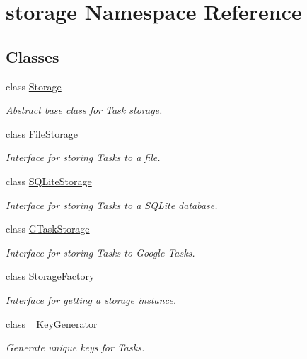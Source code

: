 \hypertarget{namespacestorage}{
\section{storage \-Namespace \-Reference}
\label{namespacestorage}
}
\subsection*{\-Classes}
\begin{DoxyCompactItemize}
\item 
class \hyperlink{classstorage_1_1Storage}{\-Storage}
\begin{DoxyCompactList}\small\item\em \-Abstract base class for \-Task storage. \end{DoxyCompactList}\item 
class \hyperlink{classstorage_1_1FileStorage}{\-File\-Storage}
\begin{DoxyCompactList}\small\item\em \-Interface for storing \-Tasks to a file. \end{DoxyCompactList}\item 
class \hyperlink{classstorage_1_1SQLiteStorage}{\-S\-Q\-Lite\-Storage}
\begin{DoxyCompactList}\small\item\em \-Interface for storing \-Tasks to a \-S\-Q\-Lite database. \end{DoxyCompactList}\item 
class \hyperlink{classstorage_1_1GTaskStorage}{\-G\-Task\-Storage}
\begin{DoxyCompactList}\small\item\em \-Interface for storing \-Tasks to \-Google \-Tasks. \end{DoxyCompactList}\item 
class \hyperlink{classstorage_1_1StorageFactory}{\-Storage\-Factory}
\begin{DoxyCompactList}\small\item\em \-Interface for getting a storage instance. \end{DoxyCompactList}\item 
class \hyperlink{classstorage_1_1__KeyGenerator}{\-\_\-\-Key\-Generator}
\begin{DoxyCompactList}\small\item\em \-Generate unique keys for \-Tasks. \end{DoxyCompactList}\end{DoxyCompactItemize}
